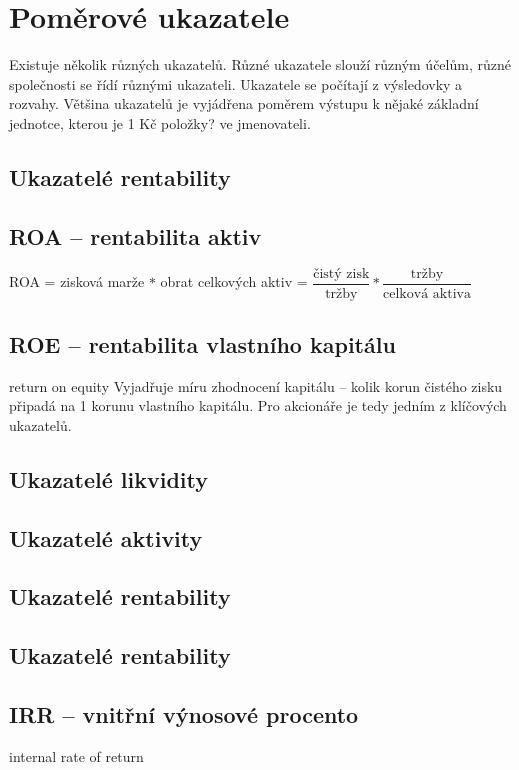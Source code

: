\section{Poměrové ukazatele}
Existuje několik různých ukazatelů. Různé ukazatele slouží různým účelům, různé společnosti se řídí různými ukazateli. Ukazatele se počítají z výsledovky a rozvahy. Většina ukazatelů je vyjádřena poměrem výstupu k nějaké základní jednotce, kterou je 1 Kč položky? ve jmenovateli.

\subsection{Ukazatelé rentability}
\subsection{ROA -- rentabilita aktiv}
ROA = zisková marže $*$ obrat celkových aktiv = $\dfrac{\text{čistý zisk}}{\text{tržby}} * \dfrac{\text{tržby}}{\text{celková aktiva}}$

\subsection{ROE -- rentabilita vlastního kapitálu}
return on equity
Vyjadřuje míru zhodnocení kapitálu -- kolik korun čistého zisku připadá na 1 korunu vlastního kapitálu. Pro akcionáře je tedy jedním z klíčových ukazatelů.


\subsection{Ukazatelé likvidity}

\subsection{Ukazatelé aktivity}

\subsection{Ukazatelé rentability}

\subsection{Ukazatelé rentability}


\subsection{IRR -- vnitřní výnosové procento}
internal rate of return

